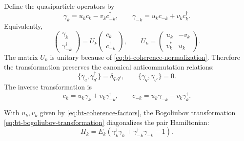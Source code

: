 Define the quasiparticle operators by
\begin{equation}
\label{eq:bt-bogoliubov-transformation}
    \gamma_k
    =
    u_k c_k-v_k c_{-k}^\dagger,
    \qquad
    \gamma_{-k}
    =
    u_k c_{-k}+v_k c_k^\dagger.
\end{equation}
Equivalently,
\begin{equation}
\label{eq:bt-bogoliubov-transformation-matrix}
    \begin{pmatrix}
        \gamma_k\\
        \gamma_{-k}^\dagger
    \end{pmatrix}
    =
    U_k
    \begin{pmatrix}
        c_k\\
        c_{-k}^\dagger
    \end{pmatrix},
    \qquad
    U_k
    =
    \begin{pmatrix}
        u_k&-v_k\\
        v_k^*&u_k
    \end{pmatrix}.
\end{equation}
The matrix $U_k$ is unitary because of
\cref{eq:bt-coherence-normalization}.  Therefore the transformation preserves the
canonical anticommutation relations:
\begin{equation}
\label{eq:bt-quasiparticle-car}
    \{\gamma_q,\gamma_{q'}^\dagger\}=\delta_{q,q'},
    \qquad
    \{\gamma_q,\gamma_{q'}\}=0.
\end{equation}
The inverse transformation is
\begin{equation}
\label{eq:bt-inverse-bogoliubov-transformation}
    c_k=u_k\gamma_k+v_k\gamma_{-k}^\dagger,
    \qquad
    c_{-k}=u_k\gamma_{-k}-v_k\gamma_k^\dagger.
\end{equation}

\begin{proposition}
\label{prop:bt-one-block-diagonalization}
With $u_k,v_k$ given by \cref{eq:bt-coherence-factors}, the Bogoliubov
transformation \cref{eq:bt-bogoliubov-transformation} diagonalizes the pair
Hamiltonian:
\begin{equation}
\label{eq:bt-pair-diagonalized}
    H_k
    =
    E_k\left(\gamma_k^\dagger\gamma_k+
    \gamma_{-k}^\dagger\gamma_{-k}-1\right).
\end{equation}
\end{proposition}

